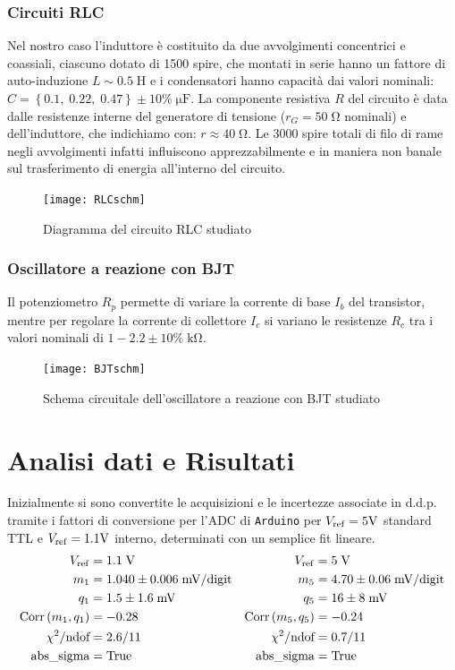 \documentclass{article}[a4paper, oneside, 11pt]
\begin{document}
\subsubsection{Circuiti RLC}
Nel nostro caso l'induttore è costituito da due avvolgimenti concentrici
e coassiali, ciascuno dotato di 1500 spire, che montati in serie hanno un
fattore di auto-induzione $L \sim 0.5 \; \si{\henry}$ e i condensatori hanno
capacità dai valori nominali: $C = \left\{0.1,\; 0.22,\; 0.47\right\} \pm
10\% \; \si{\micro\farad}$. La componente resistiva $R$ del circuito è data
dalle resistenze interne del generatore di tensione ($r_G = 50 \; \si{\ohm}$
nominali) e dell'induttore, che indichiamo con: $r \approx 40 \;\si{\ohm}$.
Le $3000$ spire totali di filo di rame negli avvolgimenti infatti
influiscono apprezzabilmente e in maniera non banale sul trasferimento
di energia all'interno del circuito.

\begin{figure}[!htp]
	\centering 
		\texttt{[image: RLCschm]}
	\caption{Diagramma del circuito RLC studiato\label{schm: RLC}}
\end{figure}

\subsubsection{Oscillatore a reazione con BJT}
Il potenziometro $R_p$ permette di variare la corrente di base $I_b$ 
del transistor, mentre per regolare la corrente di collettore $I_c$ si variano
le resistenze $R_c$ tra i valori nominali di $1 - 2.2 \pm 10 \% \; 
\si{\kilo\ohm}$. 

\begin{figure}[!htp]
	\centering 
		\texttt{[image: BJTschm]}
	\caption{Schema circuitale dell'oscillatore a reazione con BJT
	studiato\label{schm: BJT}}
\end{figure}
\section{Analisi dati e Risultati}
Inizialmente si sono convertite le acquisizioni e le incertezze associate in
d.d.p. tramite i fattori di conversione per l'ADC di \verb+Arduino+ per
$V_{\rm ref} = 5 \si{\V}$ standard TTL e $V_{\rm ref} = 1.1 \si{\V}$
interno, determinati con un semplice fit lineare.
\begin{align*}
	V_{\rm ref} &= 1.1\; \rm V	&V_{\rm ref} &= 5\; \rm V \\
	m_1 &= 1.040 \pm  0.006  \; \mathrm{mV/digit} 
	& m_5  &= 4.70 \pm 0.06  \; \mathrm{mV/digit} \\
	q_1 &= 1.5 \pm 1.6  \; \si{\mV} 	
	&q_5 &= 16  \pm 8  \; \si{\mV} \\
	\corr{m_1} {q_1} &= - 0.28      &\corr{m_5}{q_5} &= - 0.24 \\
	\chi^2/\text{ndof} &= 2.6/11	&\chi^2/\text{ndof} &= 0.7/11 \\ 
	\text{abs\_sigma} &= \rm True	&\text{abs\_sigma} &= \rm True
\end{align*}
\end{document}
